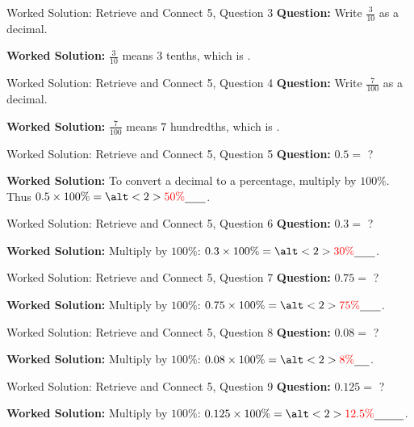 \documentclass{beamer}
\newcommand{\ablank}[1]{%
  \alt<2>{\textcolor{red}{#1}}{\underline{\phantom{#1}}}%
}
\begin{document}
\begin{frame}[t]{Worked Solution: Retrieve and Connect 5, Question 3}
\textbf{Question:} Write \(\frac{3}{10}\) as a decimal.

\smallskip
\textbf{Worked Solution:} \(\frac{3}{10}\) means \(3\) tenths, which is \ablank{$0.3$}.
\end{frame}

\begin{frame}[t]{Worked Solution: Retrieve and Connect 5, Question 4}
\textbf{Question:} Write \(\frac{7}{100}\) as a decimal.

\smallskip
\textbf{Worked Solution:} \(\frac{7}{100}\) means \(7\) hundredths, which is \ablank{$0.07$}.
\end{frame}

\begin{frame}[t]{Worked Solution: Retrieve and Connect 5, Question 5}
\textbf{Question:} \(0.5 =\) ?

\smallskip
\textbf{Worked Solution:} To convert a decimal to a percentage, multiply by \(100\%\). Thus \(0.5 \times 100\% = \ablank{50\%}\).
\end{frame}

\begin{frame}[t]{Worked Solution: Retrieve and Connect 5, Question 6}
\textbf{Question:} \(0.3 =\) ?

\smallskip
\textbf{Worked Solution:} Multiply by \(100\%\): \(0.3 \times 100\% = \ablank{30\%}\).
\end{frame}

\begin{frame}[t]{Worked Solution: Retrieve and Connect 5, Question 7}
\textbf{Question:} \(0.75 =\) ?

\smallskip
\textbf{Worked Solution:} Multiply by \(100\%\): \(0.75 \times 100\% = \ablank{75\%}\).
\end{frame}

\begin{frame}[t]{Worked Solution: Retrieve and Connect 5, Question 8}
\textbf{Question:} \(0.08 =\) ?

\smallskip
\textbf{Worked Solution:} Multiply by \(100\%\): \(0.08 \times 100\% = \ablank{8\%}\).
\end{frame}

\begin{frame}[t]{Worked Solution: Retrieve and Connect 5, Question 9}
\textbf{Question:} \(0.125 =\) ?

\smallskip
\textbf{Worked Solution:} Multiply by \(100\%\): \(0.125 \times 100\% = \ablank{12.5\%}\).
\end{frame}
\end{document}
